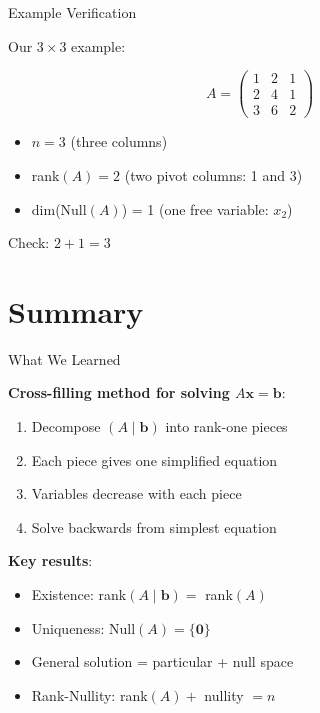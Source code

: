 \documentclass[10pt]{beamer}
\theoremstyle{definition}
\newcommand{\x}[1]{\alert{\textbf{#1}}}
\begin{document}
\begin{frame}{Example Verification}

Our $3 \times 3$ example:

$$A = \begin{pmatrix} 1&2&1 \\ 2&4&1 \\ 3&6&2 \end{pmatrix}$$

\vspace{1em}

\begin{itemize}
\item $n = 3$ (three columns)
\item rank$(A) = 2$ (two pivot columns: 1 and 3)
\item dim(Null$(A)$) = 1 (one free variable: $x_2$)
\end{itemize}

\vspace{1em}

Check: $2 + 1 = 3$ \checkmark

\end{frame}

\section{Summary}

\begin{frame}{What We Learned}

\x{Cross-filling method for solving $A\mathbf{x} = \mathbf{b}$}:
\begin{enumerate}
\item Decompose $(A \mid \mathbf{b})$ into rank-one pieces
\item Each piece gives one simplified equation
\item Variables decrease with each piece
\item Solve backwards from simplest equation
\end{enumerate}

\vspace{1em}

\x{Key results}:
\begin{itemize}
\item Existence: rank$(A \mid \mathbf{b}) = $ rank$(A)$
\item Uniqueness: Null$(A) = \{\mathbf{0}\}$
\item General solution = particular + null space
\item Rank-Nullity: rank$(A) + $ nullity $ = n$
\end{itemize}

\end{frame}
\end{document}
